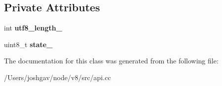 \subsection*{Private Attributes}
\begin{DoxyCompactItemize}
\item 
int {\bfseries utf8\+\_\+length\+\_\+}\hypertarget{classv8_1_1_utf8_length_helper_1_1_visitor_acec258fed122e59d255e8c3da74197fa}{}\label{classv8_1_1_utf8_length_helper_1_1_visitor_acec258fed122e59d255e8c3da74197fa}

\item 
uint8\+\_\+t {\bfseries state\+\_\+}\hypertarget{classv8_1_1_utf8_length_helper_1_1_visitor_ac9477a98cafddec80c672996705b1add}{}\label{classv8_1_1_utf8_length_helper_1_1_visitor_ac9477a98cafddec80c672996705b1add}

\end{DoxyCompactItemize}


The documentation for this class was generated from the following file\+:\begin{DoxyCompactItemize}
\item 
/\+Users/joshgav/node/v8/src/api.\+cc\end{DoxyCompactItemize}
